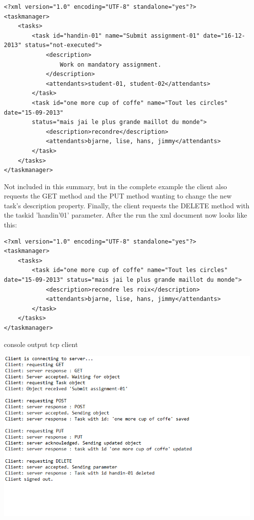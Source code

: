 \begin{lstlisting}[caption=xml after POST]
<?xml version="1.0" encoding="UTF-8" standalone="yes"?>
<taskmanager>
	<tasks>
		<task id="handin-01" name="Submit assignment-01" date="16-12-2013" status="not-executed">
			<description>
				Work on mandatory assignment.
			</description>
			<attendants>student-01, student-02</attendants>
		</task>
		<task id="one more cup of coffe" name="Tout les circles" date="15-09-2013" 
		status="mais jai le plus grande maillot du monde">
			<description>recondre</description>
			<attendants>bjarne, lise, hans, jimmy</attendants>
		</task>
	</tasks>
</taskmanager>
\end{lstlisting}

Not included in this summary, but in the complete example the client also requests the GET method and the PUT method wanting to change the new task's description property. Finally, the client requests the DELETE method with the taskid 'handin'01' parameter. After the run the xml document now looks like this:

\begin{lstlisting}[caption=xml after PUT]
<?xml version="1.0" encoding="UTF-8" standalone="yes"?>
<taskmanager>
	<tasks>
		<task id="one more cup of coffe" name="Tout les circles" date="15-09-2013" status="mais jai le plus grande maillot du monde">
			<description>recondre les roix</description>
			<attendants>bjarne, lise, hans, jimmy</attendants>
		</task>
	</tasks>
</taskmanager>
\end{lstlisting}



\begin{center}
\centering
\caption{console output tcp client}
\includegraphics[scale=0.7]{images/TCP_run_client.png}
\end{center}
\vspace{10pt}


